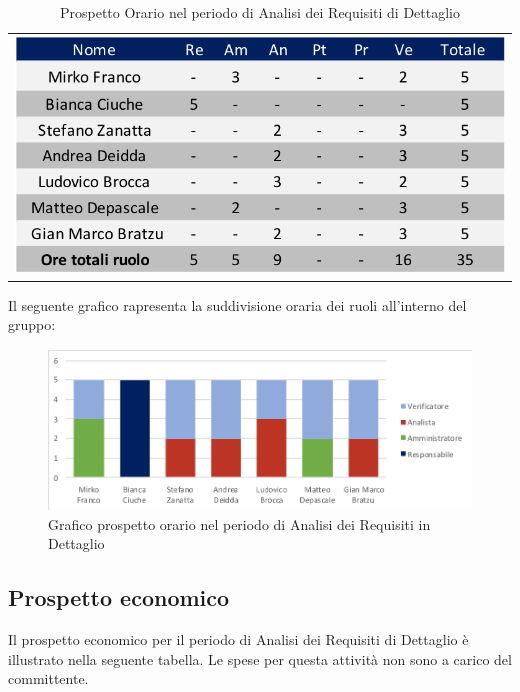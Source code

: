 \begin{table}[!ht]
	\begin{center}
		\begin{tabular}{c}
			\includegraphics[scale=0.90]{images/tabellaProspettoOrarioDett.png}
		\end{tabular}
		\caption{Prospetto Orario nel periodo di Analisi dei Requisiti di Dettaglio}
	\end{center}
\end{table}
Il seguente grafico rapresenta la suddivisione oraria dei ruoli all'interno del gruppo:
\begin{figure}[!ht]
	\begin{center}
		\includegraphics{images/grafoProspettoOrarioDett.png}
		\caption{Grafico prospetto orario nel periodo di Analisi dei Requisiti in Dettaglio}
	\end{center}
\end{figure}
\newpage
\subsection{Prospetto economico}
Il prospetto economico per il periodo di Analisi dei Requisiti di Dettaglio è illustrato nella seguente tabella.
Le spese per questa attività non sono a carico del committente.


